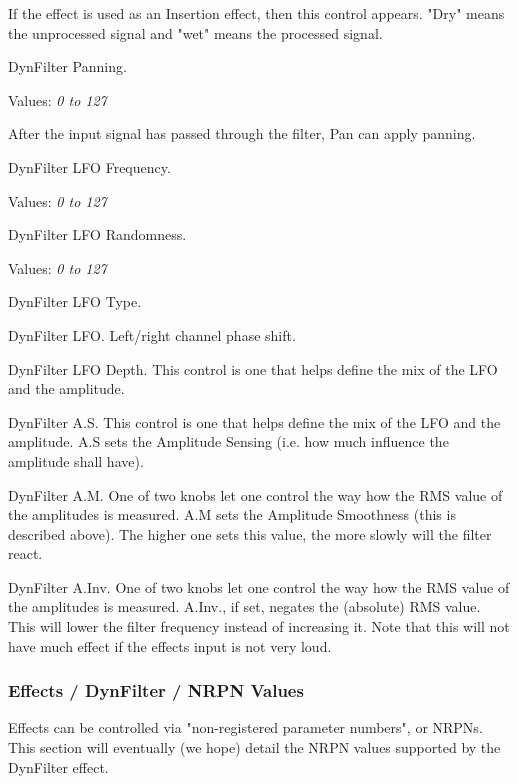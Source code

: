    If the effect is used as an Insertion effect, then this control appears.
   "Dry" means the unprocessed signal and "wet" means the processed signal.

   DynFilter Panning.

   Values: \textsl{0 to 127}

   After the input signal has passed through the filter, Pan can apply
   panning.

   DynFilter LFO Frequency.

   Values: \textsl{0 to 127}

   DynFilter LFO Randomness.

   Values: \textsl{0 to 127}

   DynFilter LFO Type.

   DynFilter LFO.
   Left/right channel phase shift.

   DynFilter LFO Depth.
   This control is one that helps define the mix of the LFO and the
   amplitude.

   DynFilter A.S.
   This control is one that helps define the mix of the LFO and the
   amplitude.
   A.S sets the Amplitude Sensing (i.e. how much influence the amplitude
   shall have).

   DynFilter A.M.
   One of two knobs let one control the way how the RMS value of the
   amplitudes is measured.
   A.M sets the Amplitude Smoothness (this is described above). The higher
   one sets this value, the more slowly will the filter react.

   DynFilter A.Inv.  One of two knobs let one control the way how the RMS
   value of the amplitudes is measured.  A.Inv., if set, negates the
   (absolute) RMS value. This will lower the filter frequency instead of
   increasing it. Note that this will not have much effect if the effects
   input is not very loud.

\subsubsection{Effects / DynFilter / NRPN Values}
\label{subsubsec:effects_edit_dynfilter_nrpn}

   Effects can be controlled via "non-registered parameter numbers", or NRPNs.
   This section will eventually (we hope)
   detail the NRPN values supported by the DynFilter effect.

